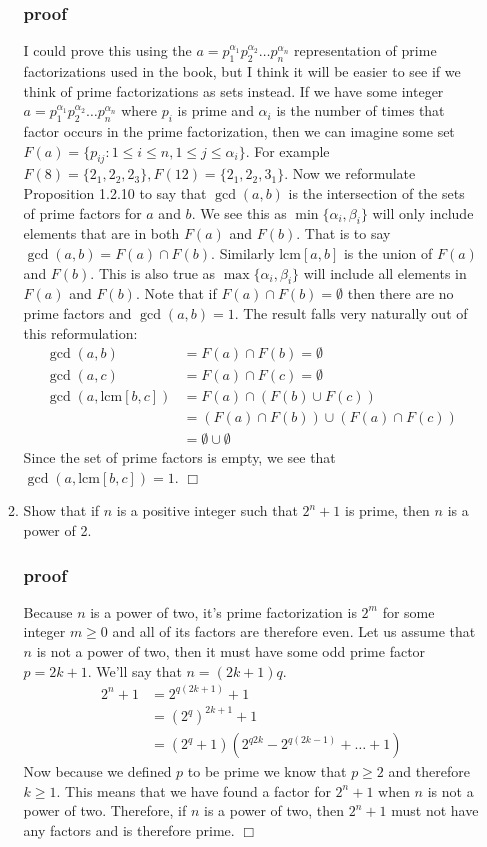 \documentclass[letterpaper]{article}
\begin{document}
\begin{enumerate}
\begin{enumerate}
\subsubsection*{proof}
I could prove this using the $a=p_1^{\alpha_1}p_2^{\alpha_2}\dots p_n^{\alpha_n}$ representation of prime factorizations used in the book, but I think it will be easier to see if we think of prime factorizations as sets instead. If we have some integer $a=p_1^{\alpha_1}p_2^{\alpha_2}\dots p_n^{\alpha_n}$ where $p_i$ is prime and $\alpha_i$ is the number of times that factor occurs in the prime factorization, then we can imagine some set $F(a)=\{p_{ij}:1\le i\le n, 1\le j\le \alpha_i\}$. For example $F(8)=\{2_1,2_2,2_3\}, F(12)=\{2_1,2_2,3_1\}$. Now we reformulate Proposition 1.2.10 to say that $\gcd(a,b)$ is the intersection of the sets of prime factors for $a$ and $b$. We see this as $\min\{\alpha_i,\beta_i\}$ will only include elements that are in both $F(a)$ and $F(b)$. That is to say $\gcd(a,b)=F(a)\cap F(b)$. Similarly $\text{lcm}[a,b]$ is the union of $F(a)$ and $F(b)$. This is also true as $\max\{\alpha_i,\beta_i\}$ will include all elements in $F(a)$ and $F(b)$. Note that if $F(a)\cap F(b)=\emptyset$ then there are no prime factors and $\gcd(a,b)=1$. The result falls very naturally out of this reformulation:
\begin{align*}
  \gcd(a,b)&=F(a)\cap F(b)=\emptyset\\
  \gcd(a,c)&=F(a)\cap F(c)=\emptyset\\
  \gcd(a,\text{lcm}[b,c])&=F(a)\cap\left(F(b)\cup F(c)\right)\\
  &=\left(F(a)\cap F(b)\right)\cup\left(F(a)\cap F(c)\right)\\
  &=\emptyset\cup\emptyset
\end{align*}
Since the set of prime factors is empty, we see that $\gcd(a,\text{lcm}[b,c])=1$. $\Box$
\setcounter{enumii}{22}
\item
Show that if $n$ is a positive integer such that $2^n+1$ is prime, then $n$ is a power of 2.
\subsubsection*{proof}
Because $n$ is a power of two, it's prime factorization is $2^m$ for some integer $m\ge 0$ and all of its factors are therefore even. Let us assume that $n$ is not a power of two, then it must have some odd prime factor $p=2k+1$. We'll say that $n=(2k+1)q$.
\begin{align*}
  2^n+1&=2^{q(2k+1)}+1\\
  &=(2^q)^{2k+1}+1\\
  &=(2^q+1)(2^{q2k}-2^{q(2k-1)}+\dots+1)
\end{align*}
Now because we defined $p$ to be prime we know that $p\ge 2$ and therefore $k\ge1$. This means that we have found a factor for $2^n+1$ when $n$ is not a power of two. Therefore, if $n$ is a power of two, then $2^n+1$ must not have any factors and is therefore prime. $\Box$
\end{enumerate}
\end{enumerate}
\end{document}
